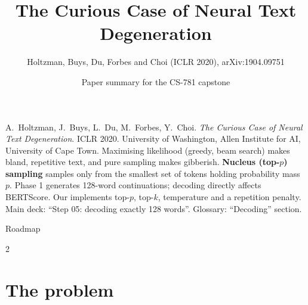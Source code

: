 \documentclass[aspectratio=169,11pt]{beamer}
\title[Nucleus Sampling]{The Curious Case of Neural Text Degeneration}
\subtitle{Holtzman, Buys, Du, Forbes and Choi (ICLR 2020), arXiv:1904.09751}
\author[Paper summary]{Paper summary for the CS-781 capstone}
\date{}
\begin{document}
\begin{frame}\titlepage\end{frame}

\paperglance
{A.\ Holtzman, J.\ Buys, L.\ Du, M.\ Forbes, Y.\ Choi. \emph{The Curious Case of Neural Text Degeneration}. ICLR 2020. University of Washington, Allen Institute for AI, University of Cape Town.}
{Maximising likelihood (greedy, beam search) makes bland, repetitive text, and pure sampling makes gibberish. \textbf{Nucleus (top-$p$) sampling} samples only from the smallest set of tokens holding probability mass $p$.}
{Phase 1 generates 128-word continuations; decoding directly affects BERTScore. Our  implements top-$p$, top-$k$, temperature and a repetition penalty.}
{Main deck: ``Step 05: decoding exactly 128 words''. Glossary: ``Decoding'' section.}

\begin{frame}{Roadmap}
  \begin{multicols}{2}\small\tableofcontents\end{multicols}
\end{frame}

\section{The problem}
\end{document}
